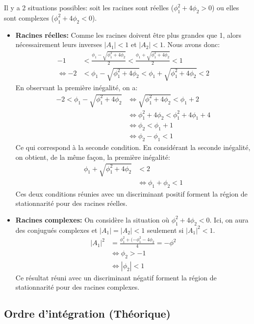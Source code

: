 \documentclass{article}
\begin{document}
Il y a 2 situations possibles: soit les racines sont réelles ($\phi_1^2+4\phi_2>0$) ou elles sont complexes ($\phi_1^2+4\phi_2<0$).
\begin{itemize}
\item \textbf{Racines réelles:}
Comme les racines doivent être plus grandes que 1, alors nécessairement leurs inverses $|A_1|<1$ et $|A_2|<1$. Nous avons donc:
\begin{align*}
-1 &< \frac{\phi_1-\sqrt{\phi_1^2+4\phi_2}}{2} <  \frac{\phi_1+\sqrt{\phi_1^2+4\phi_2}}{2} < 1 \\
\Leftrightarrow -2 &< \phi_1-\sqrt{\phi_1^2+4\phi_2} < \phi_1+\sqrt{\phi_1^2+4\phi_2} < 2
\end{align*}
En observant la première inégalité, on a:
\begin{align*}
-2 < \phi_1-\sqrt{\phi_1^2+4\phi_2}
&\Leftrightarrow \sqrt{\phi_1^2+4\phi_2}<\phi_1+2 \\
&\Leftrightarrow \phi_1^2+4\phi_2 < \phi_1^2+4\phi_1+4 \\
&\Leftrightarrow \phi_2 < \phi_1 + 1 \\
&\Leftrightarrow \phi_2 - \phi_1 < 1
\end{align*}
Ce qui correspond à la seconde condition. En considérant la seconde inégalité, on obtient, de la même façon, la première inégalité:
\begin{align*}
\phi_1+\sqrt{\phi_1^2+4\phi_2} &< 2 \\
&\Leftrightarrow \phi_1 + \phi_2 < 1
\end{align*}
Ces deux conditions réunies avec un discriminant positif forment la région de stationnarité pour des racines réelles.

\item \textbf{Racines complexes:}  
On considère la situation où $\phi_1^2+4\phi_2<0$. Ici, on aura des conjugués complexes et $|A_1| = |A_2| <1$ seulement si $|A_1|^2<1$.
\begin{align*}
|A_1|^2 &=\frac{\phi_1^2+(-\phi_1^2-4\phi_2}{4}=-\phi^2 \\
&\Leftrightarrow \phi_2>-1 \\
&\Leftrightarrow |\phi_2|<1
\end{align*}
Ce résultat réuni avec un discriminant négatif forment la région de stationnarité pour des racines complexes.
\end{itemize}

\clearpage
\subsection{Ordre d'intégration (Théorique)}
\end{document}
